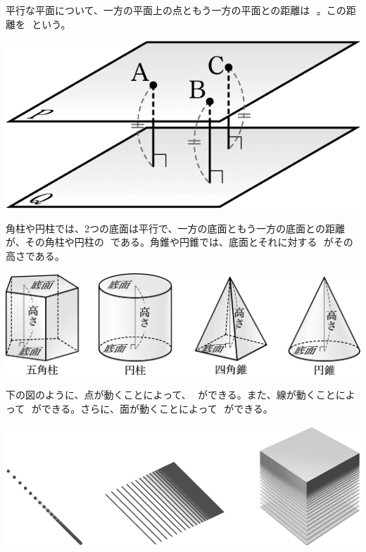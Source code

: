 \documentclass[
  12pt,a4paper,lualatex,ja=standard]{bxjsarticle}
\begin{document}
\vspace{10mm}

\begin{multicols}{2}
平行な平面について、一方の平面上の点ともう一方の平面との距離は\,  \,。この距離を\,  \,という。

\columnbreak

\begin{center}
\includegraphics{media/image80.png}
\end{center}
\end{multicols}

角柱や円柱では、2つの底面は平行で、一方の底面ともう一方の底面との距離が、その角柱や円柱の\,  \,である。角錐や円錐では、底面とそれに対する\,  \,がその高さである。

\begin{center}
\includegraphics{media/image82.png}
\end{center}

\newpage

下の図のように、点が動くことによって、\,  \,ができる。また、線が動くことによって\,  \,ができる。さらに、面が動くことによって\,  \,ができる。

\begin{center}
\includegraphics{media/image87.png}
\end{center}
\end{document}
